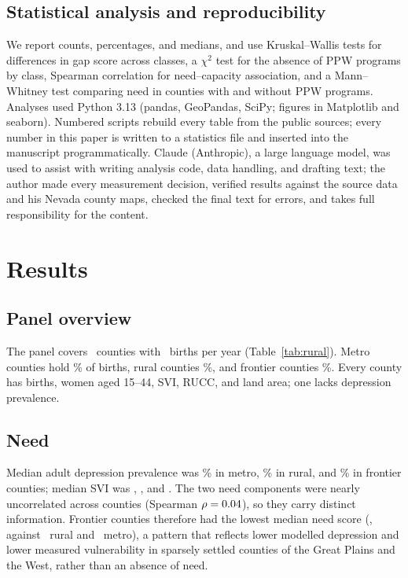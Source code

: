 \documentclass[10pt,twocolumn,letterpaper]{article}
\begin{document}
\subsection{Statistical analysis and reproducibility}\label{sec:stats}
We report counts, percentages, and medians, and use Kruskal--Wallis tests for differences in gap score across classes, a $\chi^2$ test for the absence of PPW programs by class, Spearman correlation for need--capacity association, and a Mann--Whitney test comparing need in counties with and without PPW programs. Analyses used Python 3.13 (pandas, GeoPandas, SciPy; figures in Matplotlib and seaborn). Numbered scripts rebuild every table from the public sources; every number in this paper is written to a statistics file and inserted into the manuscript programmatically. Claude (Anthropic), a large language model, was used to assist with writing analysis code, data handling, and drafting text; the author made every measurement decision, verified results against the source data and his Nevada county maps, checked the final text for errors, and takes full responsibility for the content.

\section{Results}

\subsection{Panel overview}
The panel covers \NCounties\ counties with \BirthsTotal\ births per year (Table~\ref{tab:rural}). Metro counties hold \PctBirthsMetro\% of births, rural counties \PctBirthsRural\%, and frontier counties \PctBirthsFrontier\%. Every county has births, women aged 15--44, SVI, RUCC, and land area; one lacks depression prevalence.

\begin{table}[!tbp]
\centering
\caption{County characteristics by rurality class. BH: behavioral health; PPW SUD: substance use treatment listing with a pregnant/postpartum women program. Scores are national percentile ranks (0--100).}
\label{tab:rural}
\scriptsize
\setlength{\tabcolsep}{3pt}
\resizebox{\columnwidth}{!}{}
\end{table}

\subsection{Need}
Median adult depression prevalence was \DepMedMetro\% in metro, \DepMedRural\% in rural, and \DepMedFrontier\% in frontier counties; median SVI was \SVIMedMetro, \SVIMedRural, and \SVIMedFrontier. The two need components were nearly uncorrelated across counties (Spearman $\rho=0.04$), so they carry distinct information. Frontier counties therefore had the lowest median need score (\NeedMedFrontier, against \NeedMedRural\ rural and \NeedMedMetro\ metro), a pattern that reflects lower modelled depression and lower measured vulnerability in sparsely settled counties of the Great Plains and the West, rather than an absence of need.
\end{document}
